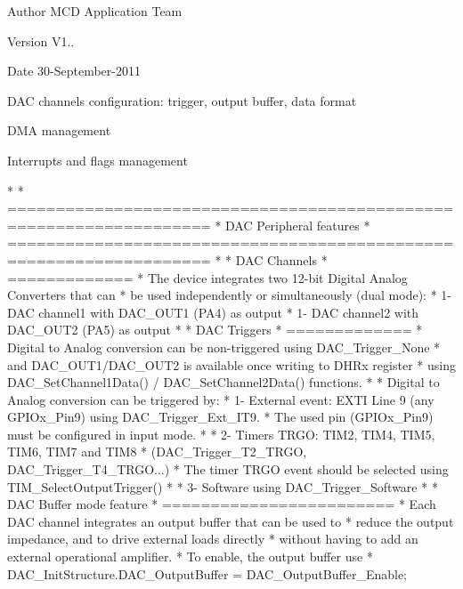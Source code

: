 \begin{DoxyAuthor}{Author}
M\+CD Application Team 
\end{DoxyAuthor}
\begin{DoxyVersion}{Version}
V1.. 
\end{DoxyVersion}
\begin{DoxyDate}{Date}
30-\/\+September-\/2011
\begin{DoxyItemize}
\item D\+AC channels configuration\+: trigger, output buffer, data format
\item D\+MA management
\item Interrupts and flags management
\end{DoxyItemize}
\end{DoxyDate}
\begin{DoxyVerb}*    
*          ===================================================================
*                             DAC Peripheral features
*          ===================================================================
*          
*          DAC Channels
*          =============  
*          The device integrates two 12-bit Digital Analog Converters that can 
*          be used independently or simultaneously (dual mode):
*            1- DAC channel1 with DAC_OUT1 (PA4) as output
*            1- DAC channel2 with DAC_OUT2 (PA5) as output
*
*          DAC Triggers
*          =============
*          Digital to Analog conversion can be non-triggered using DAC_Trigger_None
*          and DAC_OUT1/DAC_OUT2 is available once writing to DHRx register 
*          using DAC_SetChannel1Data() / DAC_SetChannel2Data() functions.
*   
*         Digital to Analog conversion can be triggered by:
*             1- External event: EXTI Line 9 (any GPIOx_Pin9) using DAC_Trigger_Ext_IT9.
*                The used pin (GPIOx_Pin9) must be configured in input mode.
*
*             2- Timers TRGO: TIM2, TIM4, TIM5, TIM6, TIM7 and TIM8 
*                (DAC_Trigger_T2_TRGO, DAC_Trigger_T4_TRGO...)
*                The timer TRGO event should be selected using TIM_SelectOutputTrigger()
*
*             3- Software using DAC_Trigger_Software
*
*          DAC Buffer mode feature
*          ========================  
*          Each DAC channel integrates an output buffer that can be used to 
*          reduce the output impedance, and to drive external loads directly
*          without having to add an external operational amplifier.
*          To enable, the output buffer use  
*              DAC_InitStructure.DAC_OutputBuffer = DAC_OutputBuffer_Enable;

\end{DoxyVerb}
